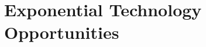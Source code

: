 \documentclass[letter,11pt]{article}
\begin{document}

\section{Exponential Technology Opportunities}
\end{document}
